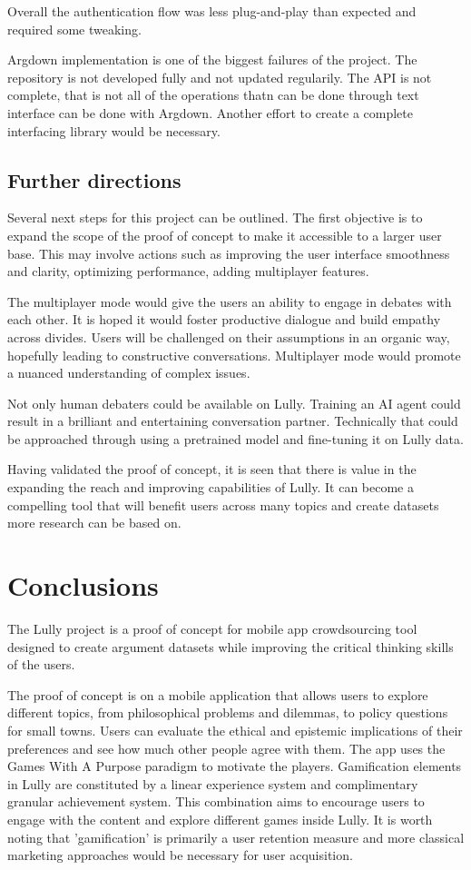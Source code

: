\documentclass{report}
\begin{document}
Overall the authentication flow was less plug-and-play than expected and required some tweaking. 

Argdown implementation is one of the biggest failures of the project. The repository is not developed fully and not updated regularily. The API is not complete, that is not all of the operations thatn can be done through text interface can be done with Argdown. Another effort to create a complete interfacing library would be necessary.


\section{Further directions}
Several next steps for this project can be outlined. The first objective is to expand the scope of the proof of concept to make it accessible to a larger user base. This may involve actions such as improving the user interface smoothness and clarity, optimizing performance, adding multiplayer features.

The multiplayer mode would give the users an ability to engage in debates with each other. It is hoped it would foster productive dialogue and build empathy across divides.
Users will be challenged on their assumptions in an organic way, hopefully leading to constructive conversations. Multiplayer mode would promote a nuanced understanding of complex issues.

Not only human debaters could be available on Lully. Training an AI agent could result in a brilliant and entertaining conversation partner. Technically that could be approached through using a pretrained model and fine-tuning it on Lully data.

Having validated the proof of concept, it is seen that there is value in the expanding the reach and improving capabilities of Lully. It can become a compelling tool that will benefit users across many topics and create datasets more research can be based on.

\newpage

\chapter{Conclusions}

The Lully project is a proof of concept for mobile app crowdsourcing tool designed to create argument datasets while improving the critical thinking skills of the users. 

The proof of concept is on a mobile application that allows users to explore different topics, from philosophical problems and dilemmas, to policy questions for small towns. Users can evaluate the ethical and epistemic implications of their preferences and see how much other people agree with them. The app uses the Games With A Purpose paradigm to motivate the players. Gamification elements in Lully are constituted by a linear experience system and complimentary granular achievement system. This combination aims to encourage users to engage with the content and explore different games inside Lully. It is worth noting that 'gamification' is primarily a user retention measure and more classical marketing approaches would be necessary for user acquisition.
\end{document}
